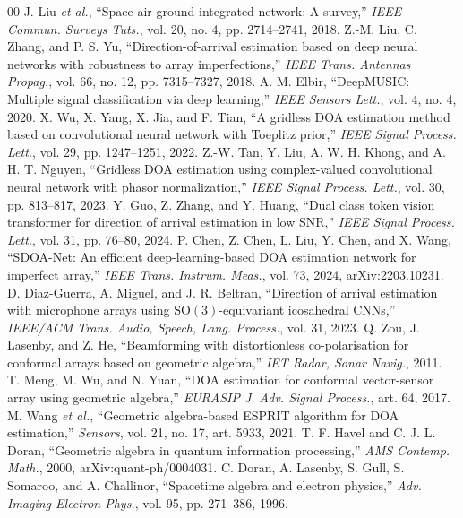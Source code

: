 \documentclass[conference]{IEEEtran}
\begin{document}
\begin{thebibliography}{00}
 J. Liu \emph{et al.}, ``Space-air-ground integrated network: A survey,'' \emph{IEEE Commun. Surveys Tuts.}, vol. 20, no. 4, pp. 2714--2741, 2018.
 Z.-M. Liu, C. Zhang, and P. S. Yu, ``Direction-of-arrival estimation based on deep neural networks with robustness to array imperfections,'' \emph{IEEE Trans. Antennas Propag.}, vol. 66, no. 12, pp. 7315--7327, 2018.
 A. M. Elbir, ``DeepMUSIC: Multiple signal classification via deep learning,'' \emph{IEEE Sensors Lett.}, vol. 4, no. 4, 2020.
 X. Wu, X. Yang, X. Jia, and F. Tian, ``A gridless DOA estimation method based on convolutional neural network with Toeplitz prior,'' \emph{IEEE Signal Process. Lett.}, vol. 29, pp. 1247--1251, 2022.
 Z.-W. Tan, Y. Liu, A. W. H. Khong, and A. H. T. Nguyen, ``Gridless DOA estimation using complex-valued convolutional neural network with phasor normalization,'' \emph{IEEE Signal Process. Lett.}, vol. 30, pp. 813--817, 2023.
 Y. Guo, Z. Zhang, and Y. Huang, ``Dual class token vision transformer for direction of arrival estimation in low SNR,'' \emph{IEEE Signal Process. Lett.}, vol. 31, pp. 76--80, 2024.
 P. Chen, Z. Chen, L. Liu, Y. Chen, and X. Wang, ``SDOA-Net: An efficient deep-learning-based DOA estimation network for imperfect array,'' \emph{IEEE Trans. Instrum. Meas.}, vol. 73, 2024, arXiv:2203.10231.
 D. Diaz-Guerra, A. Miguel, and J. R. Beltran, ``Direction of arrival estimation with microphone arrays using $\mathrm{SO}(3)$-equivariant icosahedral CNNs,'' \emph{IEEE/ACM Trans. Audio, Speech, Lang. Process.}, vol. 31, 2023.
 Q. Zou, J. Lasenby, and Z. He, ``Beamforming with distortionless co-polarisation for conformal arrays based on geometric algebra,'' \emph{IET Radar, Sonar Navig.}, 2011.
 T. Meng, M. Wu, and N. Yuan, ``DOA estimation for conformal vector-sensor array using geometric algebra,'' \emph{EURASIP J. Adv. Signal Process.}, art. 64, 2017.
 M. Wang \emph{et al.}, ``Geometric algebra-based ESPRIT algorithm for DOA estimation,'' \emph{Sensors}, vol. 21, no. 17, art. 5933, 2021.
 T. F. Havel and C. J. L. Doran, ``Geometric algebra in quantum information processing,'' \emph{AMS Contemp. Math.}, 2000, arXiv:quant-ph/0004031.
 C. Doran, A. Lasenby, S. Gull, S. Somaroo, and A. Challinor, ``Spacetime algebra and electron physics,'' \emph{Adv. Imaging Electron Phys.}, vol. 95, pp. 271--386, 1996.

\end{thebibliography}
\end{document}
